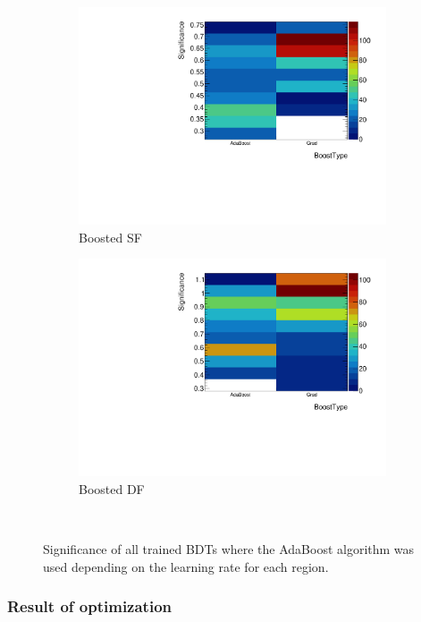 \begin{figure}[htb]
\begin{subfigure}[t]{0.45\textwidth}
        \includegraphics[width=\textwidth,page=6]{./plots/mva/scan/BOOST_SF_setting_vs_binned_sig.pdf}
        \caption{Boosted SF}
    \end{subfigure}
    \begin{subfigure}[t]{0.45\textwidth}
        \includegraphics[width=\textwidth,page=6]{./plots/mva/scan/BOOST_DF_setting_vs_binned_sig.pdf}
        \caption{Boosted DF}
    \end{subfigure}
    \caption{Significance of all trained BDTs where the AdaBoost algorithm was used depending on the learning rate for each region.}~\label{fig:mva:scan:adaboostbeta}
\end{figure}

\FloatBarrier{}

\subsubsection{Result of optimization}

